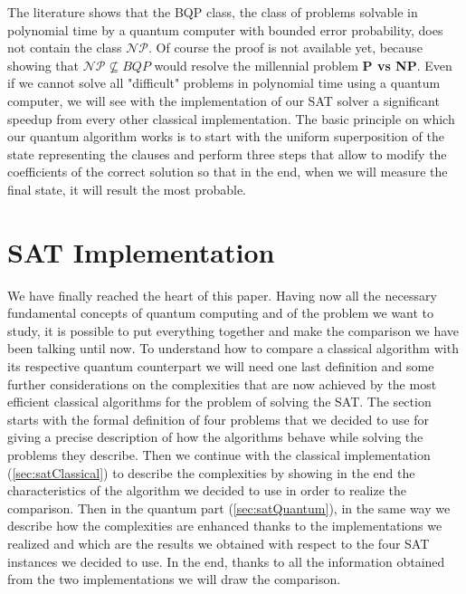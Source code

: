 \documentclass[english]{article}
\begin{document}
			The literature shows that the BQP class, the class of problems solvable in polynomial time by a quantum computer with bounded error probability, does not contain the class $\mathcal{N}\mathcal{P}$. Of course the proof is not available yet, because showing that $\mathcal{N}\mathcal{P}\nsubseteq BQP$ would resolve the millennial problem \textbf{P vs NP}. Even if we cannot solve all "difficult" problems in polynomial time using a quantum computer, we will see with the implementation of our SAT solver a significant speedup from every other classical implementation. The basic principle on which our quantum algorithm works is to start with the uniform superposition of the state representing the clauses and perform three steps that allow to modify the coefficients of the correct solution so that in the end, when we will measure the final state, it will result the most probable.
		
	\section{SAT Implementation}
	\label{sec:satImpl}
		We have finally reached the heart of this paper. Having now all the necessary fundamental concepts of quantum computing and of the problem we want to study, it is possible to put everything together and make the comparison we have been talking until now. To understand how to compare a classical algorithm with its respective quantum counterpart we will need one last definition and some further considerations on the complexities that are now achieved by the most efficient classical algorithms for the problem of solving the SAT. The section starts with the formal definition of four problems that we decided to use for giving a precise description of how the algorithms behave while solving the problems they describe. Then we continue with the classical implementation (\ref{sec:satClassical}) to describe the complexities by showing in the end the characteristics of the algorithm we decided to use in order to realize the comparison. Then in the quantum part (\ref{sec:satQuantum}), in the same way we describe how the complexities are enhanced thanks to the implementations we realized and which are the results we obtained with respect to the four SAT instances we decided to use. In the end, thanks to all the information obtained from the two implementations we will draw the comparison. \\
	
\end{document}
